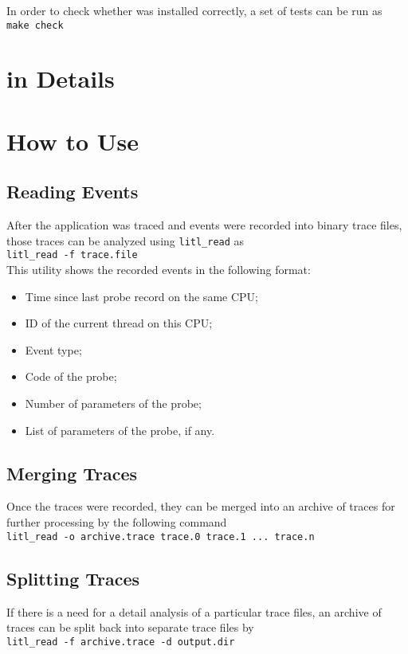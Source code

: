 In order to check whether \litl{} was installed correctly, a set of tests can be 
run as\\
    \hspace*{0.9cm}\texttt{make check}

\chapter{\litl{} in Details}
    
\chapter{How to Use \litl{}}
\section{Reading Events}
After the application was traced and events were recorded into binary trace 
files, those traces can be analyzed using \texttt{litl\_read} as\\
    \hspace*{0.9cm}\texttt{litl\_read -f trace.file}\\
This utility shows the recorded events in the following format:
\begin{itemize}
 \item Time since last probe record on the same CPU;
 \item ID of the current thread on this CPU;
 \item Event type;
 \item Code of the probe;
 \item Number of parameters of the probe;
 \item List of parameters of the probe, if any.
\end{itemize}

\section{Merging Traces}
Once the traces were recorded, they can be merged into an archive of traces for
further processing by the following command\\
    \hspace*{0.9cm}\texttt{litl\_read  -o archive.trace trace.0 trace.1 ... trace.n}

\section{Splitting Traces}
If there is a need for a detail analysis of a particular trace files, an archive
of traces can be split back into separate trace files by\\
\hspace*{0.9cm}\texttt{litl\_read  -f archive.trace -d output.dir}


